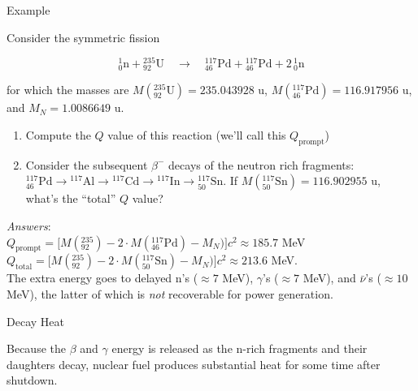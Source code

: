 \documentclass[aspectratio=1610]{beamer}
\begin{document}
\begin{frame}{Example}

Consider the symmetric fission 

\begin{equation*}
 {}^1_0 \text{n} +  {}^{235}_{92} \text{U} \quad \longrightarrow \quad {}^{117}_{46} \text{Pd} +  {}^{117}_{46} \text{Pd} + 2 \, {}^1_0 \text{n} 
\end{equation*}

for which the masses are  $M({}^{235}_{92} \text{U}) = 235.043928$ u, $M({}^{117}_{46} \text{Pd}) = 116.917956$ u, and 
 $M_N = 1.0086649$ u.

\begin{enumerate}
 \item Compute the $Q$ value of this reaction (we'll call this $Q_{\text{prompt}}$)
 \item Consider the subsequent $\beta^{-}$ decays of the neutron rich fragments: 
 ${}^{117}_{46}\text{Pd} \to {}^{117}\text{Al} \to {}^{117}\text{Cd} \to {}^{117}\text{In} \to {}^{117}_{50}\text{Sn}$.
 If  $M({}^{117}_{50} \text{Sn}) = 116.902955$ u, what's the ``total'' $Q$ value?
\end{enumerate}

\vfill
\pause 

{\tiny
{\it Answers}: \\
$Q_{\text{prompt}} = \Big[M({}^{235}_{92})-2\cdot M({}^{117}_{46} \text{Pd})-M_N) \Big]c^2 \approx 185.7$ MeV\\
$Q_{\text{total}} = \Big[M({}^{235}_{92})-2\cdot M({}^{117}_{50} \text{Sn})-M_N) \Big]c^2 \approx   213.6$ MeV. \\
The extra energy goes to delayed n's ($\approx 7$ MeV), $\gamma$'s ($\approx 7$ MeV), and $\bar{\nu}$'s ($\approx 10$ MeV), the latter of which is {\it not} recoverable for power generation.
}
\end{frame}

\begin{frame}{Decay Heat}

Because the $\beta$ and $\gamma$ energy is released as the n-rich fragments and their daughters decay, nuclear fuel 
produces substantial heat for some time after shutdown.  



\end{frame}
\end{document}

